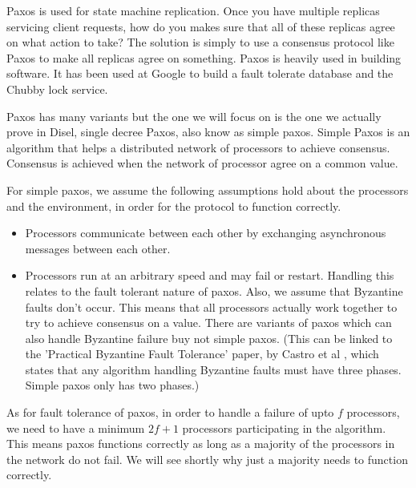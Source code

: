 Paxos is used for state machine replication. Once you have multiple replicas
servicing client requests, how do you makes sure that all of these replicas agree
on what action to take? The solution is simply to use a consensus protocol like
Paxos to make all replicas agree on something. Paxos is heavily used in building
software. It has been used at Google to build a fault tolerate database \cite{11}
and the Chubby \cite{12} lock service.

Paxos has many variants but the one we will focus on is the one we actually prove
in Disel, single decree Paxos, also know as simple paxos. Simple Paxos is an algorithm
that helps a distributed network of processors to achieve consensus.
Consensus is achieved when the network of processor agree on a common value.

For simple paxos, we assume the following assumptions hold about the processors
and the environment, in order for the protocol to function correctly.
\begin{itemize}
  \item Processors communicate between each other by exchanging asynchronous messages between each other.
  \item Processors run at an arbitrary speed and may fail or restart. Handling this relates
    to the fault tolerant nature of paxos. Also, we assume that Byzantine faults don't occur.
    This means that all processors actually work together to try to achieve consensus on a value.
    There are variants of paxos which can also handle Byzantine failure buy not simple paxos.
    (This can be linked to the 'Practical Byzantine Fault Tolerance' paper, by Castro et al \cite{2},
    which states that any algorithm handling
    Byzantine faults must have three phases. Simple paxos only has two phases.)
\end{itemize}

As for fault tolerance of paxos, in order to handle a failure of upto $f$ processors,
we need to have a minimum $2f + 1$ processors participating in the algorithm. This
means paxos functions correctly as long as a majority of the processors in the
network do not fail. We will see shortly why just a majority needs to function
correctly.

